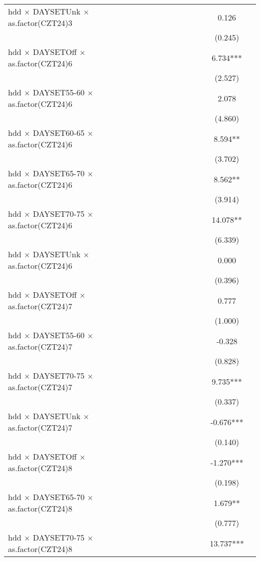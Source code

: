 \documentclass[
]{article}
\begin{document}
\begin{table}
{\begin{tabular}[t]{lcccccccccc}
hdd × DAYSETUnk × as.factor(CZT24)3 &  &  &  &  &  &  &  &  & 0.126 & \\
 &  &  &  &  &  &  &  &  & (0.245) & \\
hdd × DAYSETOff × as.factor(CZT24)6 &  &  &  &  &  &  &  &  & 6.734*** & \\
 &  &  &  &  &  &  &  &  & (2.527) & \\
hdd × DAYSET55-60 × as.factor(CZT24)6 &  &  &  &  &  &  &  &  & 2.078 & \\
 &  &  &  &  &  &  &  &  & (4.860) & \\
hdd × DAYSET60-65 × as.factor(CZT24)6 &  &  &  &  &  &  &  &  & 8.594** & \\
 &  &  &  &  &  &  &  &  & (3.702) & \\
hdd × DAYSET65-70 × as.factor(CZT24)6 &  &  &  &  &  &  &  &  & 8.562** & \\
 &  &  &  &  &  &  &  &  & (3.914) & \\
hdd × DAYSET70-75 × as.factor(CZT24)6 &  &  &  &  &  &  &  &  & 14.078** & \\
 &  &  &  &  &  &  &  &  & (6.339) & \\
hdd × DAYSETUnk × as.factor(CZT24)6 &  &  &  &  &  &  &  &  & 0.000 & \\
 &  &  &  &  &  &  &  &  & (0.396) & \\
hdd × DAYSETOff × as.factor(CZT24)7 &  &  &  &  &  &  &  &  & 0.777 & \\
 &  &  &  &  &  &  &  &  & (1.000) & \\
hdd × DAYSET55-60 × as.factor(CZT24)7 &  &  &  &  &  &  &  &  & -0.328 & \\
 &  &  &  &  &  &  &  &  & (0.828) & \\
hdd × DAYSET70-75 × as.factor(CZT24)7 &  &  &  &  &  &  &  &  & 9.735*** & \\
 &  &  &  &  &  &  &  &  & (0.337) & \\
hdd × DAYSETUnk × as.factor(CZT24)7 &  &  &  &  &  &  &  &  & -0.676*** & \\
 &  &  &  &  &  &  &  &  & (0.140) & \\
hdd × DAYSETOff × as.factor(CZT24)8 &  &  &  &  &  &  &  &  & -1.270*** & \\
 &  &  &  &  &  &  &  &  & (0.198) & \\
hdd × DAYSET65-70 × as.factor(CZT24)8 &  &  &  &  &  &  &  &  & 1.679** & \\
 &  &  &  &  &  &  &  &  & (0.777) & \\
hdd × DAYSET70-75 × as.factor(CZT24)8 &  &  &  &  &  &  &  &  & 13.737*** & \\

\end{tabular}}
\end{table}
\end{document}
